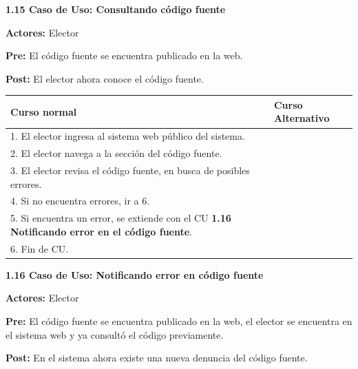 \textbf{1.15 Caso de Uso: Consultando código fuente}

\textbf{Actores:} Elector

\textbf{Pre:} El código fuente se encuentra publicado en la web.

\textbf{Post:} El elector ahora conoce el código fuente.

\begin{table}[h!]
	
 \begin{tabular}{|p{7.5cm} | p{7.5cm}|} 
 \hline
 \textbf{Curso normal} & \textbf{Curso Alternativo} \\
 \hline
1. El elector ingresa al sistema web público del sistema. & \\
 \hline


2. El elector navega a la sección del código fuente. & \\
 \hline


3. El elector revisa el código fuente, en busca de posibles errores. & \\
 \hline


4. Si no encuentra errores, ir a 6. & \\
 \hline


5. Si encuentra un error, se extiende con el CU \textbf{1.16 Notificando error en el código fuente}. & \\
 \hline


6. Fin de CU. & \\
 \hline

 \end{tabular}

\end{table}

\newpage

\textbf{1.16 Caso de Uso: Notificando error en código fuente}

\textbf{Actores:}  Elector

\textbf{Pre:} El código fuente se encuentra publicado en la web, el elector se encuentra en el sistema web y ya consultó el código previamente.

\textbf{Post:} En el sistema ahora existe una nueva denuncia del código fuente.


